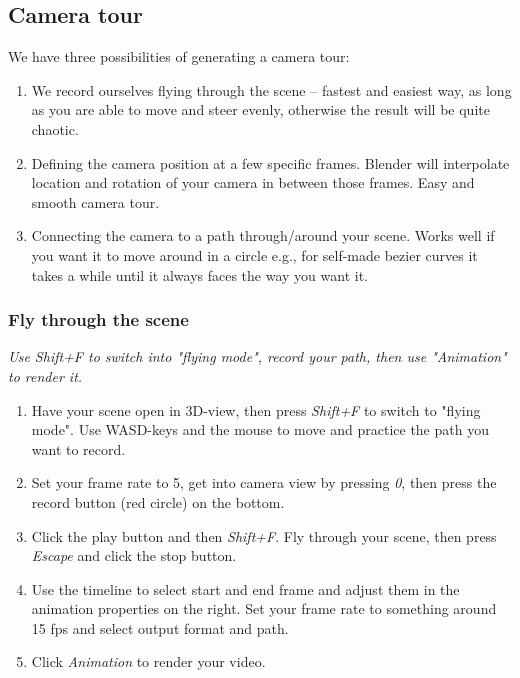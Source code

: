 \documentclass[11pt,twoside,a4paper]{fdyartcl}
\theoremstyle{myPlain}
\theoremstyle{myDefinition}
\begin{document}
\subsection{Camera tour}
We have three possibilities of generating a camera tour: 
\begin{enumerate}
	\item We record ourselves flying through the scene -- fastest and easiest way, as long as you are able to move and steer evenly, otherwise the result will be quite chaotic.
	\item Defining the camera position at a few specific frames. Blender will interpolate location and rotation of your camera in between those frames. Easy and smooth camera tour.
	\item Connecting the camera to a path through/around your scene. Works well if you want it to move around in a circle e.g., for self-made bezier curves it takes a while until it always faces the way you want it.
\end{enumerate}
\subsubsection{Fly through the scene}
\textit{Use Shift+F to switch into "flying mode", record your path, then use "Animation" to render it.}
\begin{enumerate}
	\item Have your scene open in 3D-view, then press \textit{Shift+F} to switch to "flying mode". Use WASD-keys and the mouse to move and practice the path you want to record.
	\item Set your frame rate to 5, get into camera view by pressing \textit{0}, then press the record button (red circle) on the bottom. 
	\item Click the play button and then \textit{Shift+F}. Fly through your scene, then press \textit{Escape} and click the stop button.
	\item Use the timeline to select start and end frame and adjust them in the animation properties on the right. Set your frame rate to something around 15 fps and select output format and path. 
	\item Click \textit{Animation} to render your video.
\end{enumerate}
\end{document}
